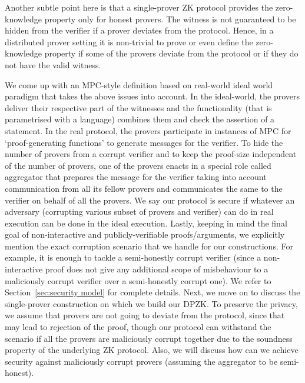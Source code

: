 Another subtle point here is that a single-prover ZK protocol provides the zero-knowledge property only for honest provers. The witness is not guaranteed to be hidden from the verifier if a prover deviates from the protocol. Hence, in a distributed prover setting it is non-trivial to prove or even define the zero-knowledge property if some of the provers deviate from the protocol or if they do not have the valid witness. 

We come up with an MPC-style definition based on real-world ideal world paradigm \cite{Canetti00,Goldreich2001,Lindell17,CohenL14}  that takes the above issues into account. In the ideal-world, the provers deliver their respective part of the witnesses and the functionality (that is parametrised with a language) combines them and check the assertion of a statement. In the real protocol,  the provers participate in  instances of MPC for `proof-generating functions' to generate messages for the verifier. To hide the number of provers from a corrupt verifier and to keep the proof-size  independent of the number of provers, one of the provers enacts in a special role called aggregator   that prepares the message for the verifier taking into account communication from all its fellow provers and communicates the same to the verifier on behalf of all the provers. We say our protocol is secure if whatever an adversary (corrupting various subset of provers and verifier) can do in real execution can be done in the ideal execution. Lastly, keeping in mind the final goal of non-interactive and publicly-verifiable proofs/arguments, we explicitly mention the exact corruption scenario that we handle for our constructions.  For example, it is enough to tackle a semi-honestly corrupt verifier (since a non-interactive proof does not give any additional scope of misbehaviour to a maliciously corrupt verifier  over a semi-honestly corrupt one).  We refer to Section~\ref{sec:security model} for complete details. Next, we move on to discuss the single-prover construction on which we build our DPZK. 
To preserve the privacy, we assume that provers are not going to deviate from the protocol, since that may lead to rejection of the proof, though our protocol can withstand the scenario if all the provers are maliciously corrupt together due to the soundness property of the underlying ZK protocol. Also, we will discuss how can we achieve security against maliciously corrupt provers (assuming the aggregator to be semi-honest).

